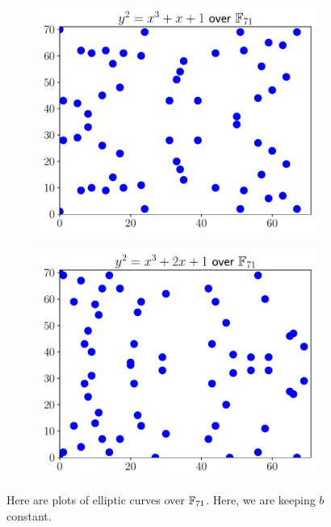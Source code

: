 \begin{figure}[p]
    \begin{subfigure}[t]{0.45\textwidth}
    \includegraphics[width=\textwidth]{plots/ec_finite/ec_finite_F_71_1_1.pdf}
    \end{subfigure}
    \begin{subfigure}[t]{0.45\textwidth}
    \includegraphics[width=\textwidth]{plots/ec_finite/ec_finite_F_71_2_1.pdf}
    \end{subfigure}
    \caption[Plots of elliptic curves over finite fields 1]{Here
        are plots of \glspl{elliptic curve} over $\mathbb{F}_{71}$.
        Here, we are keeping $b$ constant.}
    \label{fig:ec_finite_plots_1}
\end{figure}


